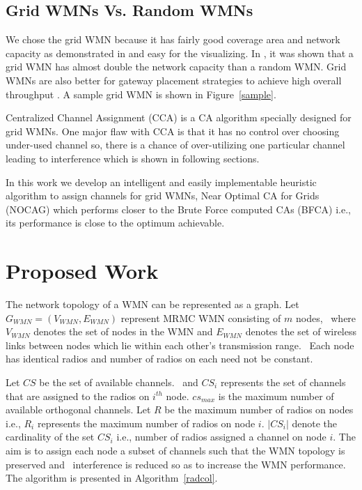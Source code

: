 \documentclass[conference]{IEEEtran}
\begin{document}
\subsection{Grid WMNs Vs. Random WMNs}

We chose the grid WMN because it has fairly good coverage area and network capacity as demonstrated in \cite{Grid,li2008gateway} and  
easy for the visualizing. In \cite{Grid}, it was shown that a grid WMN has almost double the network capacity than a random WMN. 
Grid WMNs are also better for gateway placement strategies to achieve high overall throughput \cite{li2008gateway,kala2015reliable}.
A sample grid WMN is shown in Figure~\ref{sample}. 

Centralized Channel Assignment (CCA) \cite{raniwala2004centralized} is a CA algorithm specially designed for grid WMNs. One major flaw with CCA is that it has no control over
choosing under-used channel so, there is a chance of over-utilizing
one particular channel leading to interference which is shown in following sections. 


In this work we develop an intelligent and easily implementable heuristic algorithm to assign channels for grid WMNs, 
Near Optimal CA for Grids (NOCAG) which performs closer to the Brute Force computed CAs (BFCA) i.e., its performance is close to the optimum achievable.

\section{Proposed Work}

The network topology of a WMN can be represented as a graph.
Let $G_{WMN}=(V_{WMN},E_{WMN})$ represent MRMC WMN consisting of $m$ nodes, \
where $V_{WMN}$ denotes the set of nodes in the WMN and 
$E_{WMN}$ denotes the set of wireless links between nodes which lie within each other's transmission range. \
Each node has identical radios and number of radios on each need not be constant.


Let $CS$ be the set of available channels. \
and $CS_i$ represents the set of channels that are assigned to the radios on $i^{th}$ node.
$cs_{max}$ is the maximum  number of available orthogonal channels.
Let $R$ be the maximum number of radios on nodes i.e., $R_i$ represents the maximum number of radios on node $i$.
$|CS_i|$ denote the cardinality of the set $CS_i$ i.e., number of radios assigned a channel on node $i$.
The aim is to assign each node a subset of channels such that the WMN topology is preserved and \
interference is reduced so as to increase the WMN performance. The algorithm is presented in Algorithm~\ref{radcol}.
\end{document}
